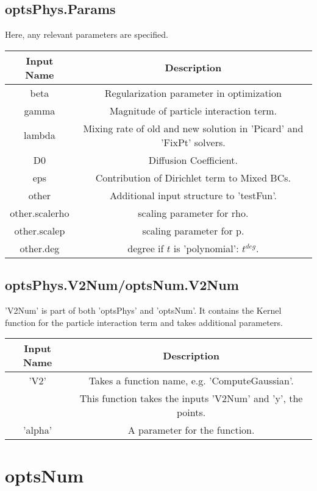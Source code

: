 \documentclass[11pt, a4paper]{article}
\theoremstyle{definition}
\begin{document}
\subsection{optsPhys.Params}
Here, any relevant parameters are specified. 

	\begin{center}
		\begin{tabular}{ |c| c | }
			\hline
			Input Name & Description \\ 
			\hline
			beta & Regularization parameter in optimization \\
			gamma & Magnitude of particle interaction term. \\ 
			lambda & Mixing rate of old and new solution in 'Picard' and 'FixPt' solvers.\\
			D0 & Diffusion Coefficient.\\
		    eps & Contribution of Dirichlet term to Mixed BCs. \\
			other & Additional input structure to 'testFun'. \\
			other.scalerho & scaling parameter for rho. \\
			other.scalep & scaling parameter for p. \\
			other.deg & degree if $t$ is 'polynomial': $t^{deg}$. \\
			\hline
		\end{tabular}
	\end{center}
\subsection{optsPhys.V2Num/optsNum.V2Num}
'V2Num' is part of both 'optsPhys' and 'optsNum'. It contains the Kernel function for the particle interaction term and takes additional parameters.
\begin{center}
	\begin{tabular}{ |c| c | }
		\hline
		Input Name &  Description \\ 
		\hline
		'V2' & Takes a function name, e.g. 'ComputeGaussian'. \\
		 & This function takes the inputs 'V2Num' and 'y', the points.\\ 
		'alpha' & A parameter for the function. \\
		\hline 
	\end{tabular}
\end{center}	
	
\section{optsNum}	
\end{document}
